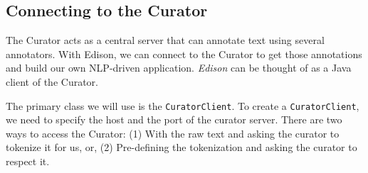\documentclass[11pt]{article}
\begin{document}
\subsection{Connecting to the Curator}
\label{sec-6-2}

   The Curator acts as a central server that can annotate text using
   several annotators. With Edison, we can connect to the Curator to
   get those annotations and build our own NLP-driven
   application. \emph{Edison} can be thought of as a Java client of the
   Curator.

   The primary class we will use is the \texttt{CuratorClient}. To create a
   \texttt{CuratorClient}, we need to specify the host and the port of the
   curator server.  There are two ways to access the Curator: (1) With
   the raw text and asking the curator to tokenize it for us, or, (2)
   Pre-defining the tokenization and asking the curator to respect it.
\end{document}
